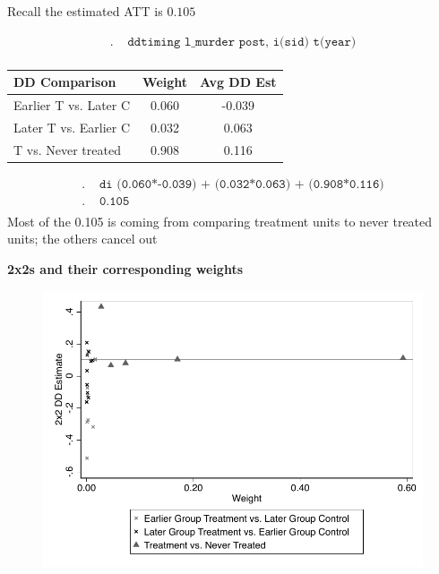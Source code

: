 \documentclass[notes=show]{beamer}
\begin{document}
\begin{frame}[plain]

Recall the estimated ATT is $0.105$

\begin{align*}
	. &\texttt{ ddtiming l_murder post, i(sid) t(year)}\\
\end{align*}

\begin{center}
\begin{tabular}{lcc}
\hline 
\multicolumn{1}{l}{DD Comparison} &
\multicolumn{1}{c}{Weight} &
\multicolumn{1}{c}{Avg DD Est} \\
\hline
Earlier T vs. Later C    &   0.060   &       -0.039 \\
Later T vs. Earlier C    &   0.032   &       0.063\\
T vs. Never treated     &    0.908   &      0.116\\
\hline
\end{tabular}
\end{center}

\begin{align*}
	. & \texttt{ di (0.060*-0.039) + (0.032*0.063) + (0.908*0.116)} \\
	. & \texttt{ 0.105} \\
\end{align*}	
Most of the 0.105 is coming from comparing treatment units to never treated units; the others cancel out

\end{frame} 

\clearpage

\begin{frame}[plain]
\begin{center}
\textbf{2x2s and their corresponding weights}
\end{center}

\begin{figure}
\includegraphics[scale=0.75]{./lecture_includes/bacon_2x2.pdf}
\end{figure}

\end{frame}
\end{document}

